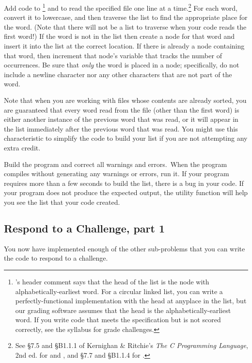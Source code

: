 Add code to \footnote{'s header comment says that the head of the list is the node with alphabetically-earliest word.
    For a circular linked list, you can write a perfectly-functional implementation with the head at anyplace in the list, but our grading software assumes that the head is the alphabetically-earliest word.
    If you write code that meets the specification but is not scored correctly, see the syllabus for grade challenges.}
and  to read the specified file one line at a time.\footnote{See \S7.5 and \S{}B1.1.1 of Kernighan \& Ritchie's \textit{The C Programming Language}, 2nd ed. for  and , and \S7.7 and \S{}B1.1.4 for .}
For each word, convert it to lowercase, and then traverse the list to find the appropriate place for the word.
(Note that there will not be a list to traverse when your code reads the first word!)
If the word is not in the list then create a node for that word and insert it into the list at the correct location.
If there is already a node containing that word, then increment that node's variable that tracks the number of occurrences.
Be sure that \textit{only} the word is placed in a node;
specifically, do not include a newline character nor any other characters that are not part of the word.

Note that when you are working with files whose contents are already sorted, you are guaranteed that every word read from the file (other than the first word) is either another instance of the previous word that was read, or it will appear in the list immediately after the previous word that was read.
You might use this characteristic to simplify the code to build your list if you are not attempting any extra credit.

Build the program and correct all warnings and errors.\ When the program compiles without generating any warnings or errors, run it.
If your program requires more than a few seconds to build the list, there is a bug in your code.
If your program does not produce the expected output, the  utility function will help you see the list that your code created.

\subsection{Respond to a Challenge, part 1}

You now have implemented enough of the other sub-problems that you can write the code to respond to a challenge.

